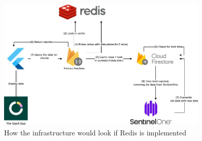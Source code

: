 \begin{figure}[htbp]
  \centering
  \includegraphics[width=0.9\textwidth]{Figures/Redis Caching.jpg}
  \caption{How the infrastructure would look if Redis is implemented}
\end{figure}

